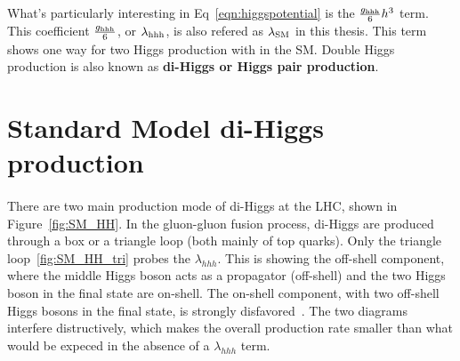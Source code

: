 \paragraph{}
What's particularly interesting in Eq~\ref{eqn:higgspotential} is the $\frac{g_{\rm hhh}}{6}h^3$ term. This coefficient $\frac{g_{\rm hhh}}{6}$, or $\lambda_{\rm hhh}$, is also refered as \textbf{$\lambda_{\rm SM}$} in this thesis.
This term shows one way for two Higgs production with in the SM. Double Higgs production is also known as \textbf{di-Higgs or Higgs pair production}.


\section{Standard Model di-Higgs production}



\paragraph{}
There are two main production mode of di-Higgs at the LHC, shown in Figure~\ref{fig:SM_HH}. In the gluon-gluon  fusion process, di-Higgs are produced through a box or a triangle loop (both mainly of top quarks). Only the triangle loop~\ref{fig:SM_HH_tri} probes the $\lambda_{hhh}$. This is showing the off-shell component, where the middle Higgs boson acts as a propagator (off-shell) and the two Higgs boson in the final state are on-shell. The on-shell component, with two off-shell Higgs bosons in the final state, is strongly disfavored~\cite{Pdg}. The two diagrams interfere distructively, which makes the overall production rate smaller than what would be expeced in the absence of a $\lambda_{hhh}$ term.

